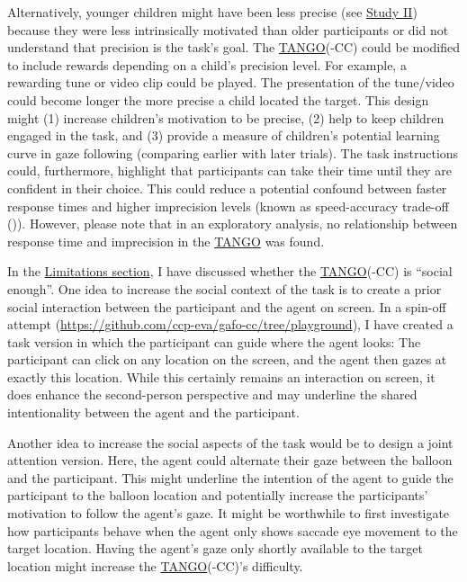 \documentclass[
]{scrbook}
\begin{document}
Alternatively, younger children might have been less precise (see \hyperref[studyII]{Study II}) because they were less intrinsically motivated than older participants or did not understand that precision is the task's goal. The \hyperref[acronyms_TANGO]{TANGO}(-CC) could be modified to include rewards depending on a child's precision level. For example, a rewarding tune or video clip could be played. The presentation of the tune/video could become longer the more precise a child located the target. This design might (1) increase children's motivation to be precise, (2) help to keep children engaged in the task, and (3) provide a measure of children's potential learning curve in gaze following (comparing earlier with later trials). The task instructions could, furthermore, highlight that participants can take their time until they are confident in their choice. This could reduce a potential confound between faster response times and higher imprecision levels (known as speed-accuracy trade-off ()). However, please note that in an exploratory analysis, no relationship between response time and imprecision in the \hyperref[acronyms_TANGO]{TANGO} was found.

In the \hyperref[limitations]{Limitations section}, I have discussed whether the \hyperref[acronyms_TANGO]{TANGO}(-CC) is ``social enough''. One idea to increase the social context of the task is to create a prior social interaction between the participant and the agent on screen. In a spin-off attempt (\mbox{\url{https://github.com/ccp-eva/gafo-cc/tree/playground}}), I have created a task version in which the participant can guide where the agent looks: The participant can click on any location on the screen, and the agent then gazes at exactly this location. While this certainly remains an interaction on screen, it does enhance the second-person perspective and may underline the shared intentionality between the agent and the participant.

Another idea to increase the social aspects of the task would be to design a joint attention version. Here, the agent could alternate their gaze between the balloon and the participant. This might underline the intention of the agent to guide the participant to the balloon location and potentially increase the participants' motivation to follow the agent's gaze. It might be worthwhile to first investigate how participants behave when the agent only shows saccade eye movement to the target location. Having the agent's gaze only shortly available to the target location might increase the \hyperref[acronyms_TANGO]{TANGO}(-CC)'s difficulty.
\end{document}
